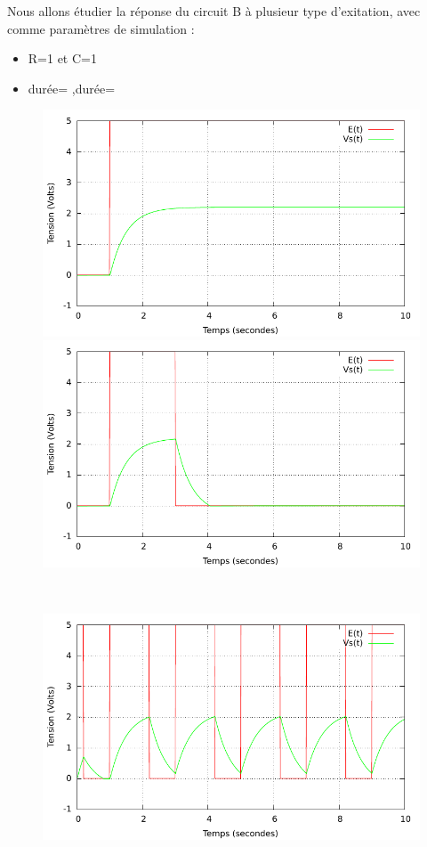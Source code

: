 \documentclass[a4paper,11pt]{article}
\begin{document}
   Nous allons étudier la réponse du circuit B à plusieur type d'exitation, avec comme paramètres de simulation :  \\
  \begin{itemize}
   \item R=1 et C=1
   \item durée= ,durée= 
  \end{itemize}
 
  \begin{figure}[h!]
   \begin{minipage}[b]{0.5\linewidth}
      \centering \includegraphics[scale=0.68]{CBechelon.pdf}
   \end{minipage}\hfill
   \begin{minipage}[b]{0.5\linewidth}   
      \centering \includegraphics[scale=.68]{CBporte.pdf}
   \end{minipage}\\
    \begin{minipage}[b]{0.5\linewidth}   
      \centering \includegraphics[scale=.68]{CBcarre.pdf}

\end{minipage}
\end{figure}
\end{document}
